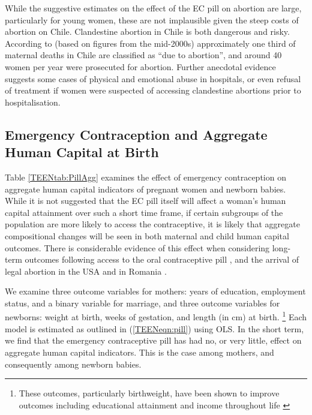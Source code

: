 While the suggestive estimates on the effect of the EC pill on abortion are 
large, particularly for young women, these are not implausible given the steep 
costs of abortion on Chile.  Clandestine abortion in Chile is both dangerous and
risky.  According to \citet{ShepardCasas2007} (based on figures from the 
mid-2000s) approximately one third of maternal deaths in Chile are classified as 
``due to abortion'', and around 40 women per year were prosecuted for abortion.
Further anecdotal evidence suggests some cases of physical and emotional abuse 
in hospitals, or even refusal of treatment if women were suspected of accessing 
clandestine abortions prior to hospitalisation.

\subsection{Emergency Contraception and Aggregate Human Capital at Birth}
Table \ref{TEENtab:PillAgg} examines the effect of emergency contraception on
aggregate human capital indicators of pregnant women and newborn babies.  While
it is not suggested that the EC pill itself will affect a woman's
human capital attainment over such a short time frame, if certain subgroups of 
the population are more likely to access the contraceptive, it is likely that 
aggregate compositional changes will be seen in both maternal and child human 
capital outcomes.  There is considerable evidence of this effect when considering
long-term outcomes following access to the oral contraceptive pill 
\citep{Baileyetal2012,OltmansHungerman2012}, and the arrival of legal abortion 
\citep{Whitaker2011,Ananatetal2009} in the USA and in Romania
\citep{PopEleches2006}.

We examine three outcome variables for mothers: years of education, employment 
status, and a binary variable for marriage, and three outcome variables for 
newborns: weight at birth, weeks of gestation, and length (in cm) at birth.%
\footnote{These outcomes, particularly birthweight, have been shown to improve 
outcomes including educational attainment and income throughout life 
\citep{BehrmanRosenzweig2004}}  Each model is estimated as outlined in 
(\ref{TEENeqn:pill}) using OLS.  In the short term, we find that the emergency
contraceptive pill has had no, or very little, effect on aggregate human capital 
indicators. This is the case among mothers, and consequently among newborn 
babies.

